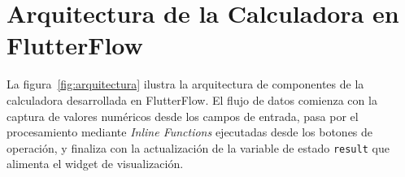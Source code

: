 \documentclass[12pt,a4paper]{article}
\begin{document}
\section{Arquitectura de la Calculadora en FlutterFlow}

La figura~\ref{fig:arquitectura} ilustra la arquitectura de componentes de la calculadora desarrollada en FlutterFlow. El flujo de datos comienza con la captura de valores numéricos desde los campos de entrada, pasa por el procesamiento mediante \textit{Inline Functions} ejecutadas desde los botones de operación, y finaliza con la actualización de la variable de estado \texttt{result} que alimenta el widget de visualización.
\end{document}
